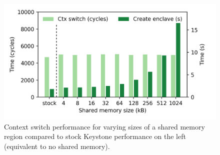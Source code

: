 \begin{figure}[t]
    \centering
    \includegraphics[width=\linewidth]{chapters/PIE/images/graphs/ctxswitch.png}
    \caption[Context switch performance]{Context switch performance for varying sizes of a shared memory region compared to stock Keystone performance on the left (equivalent to no shared memory).}
    \label{fig:ctxswitches}
\end{figure}


